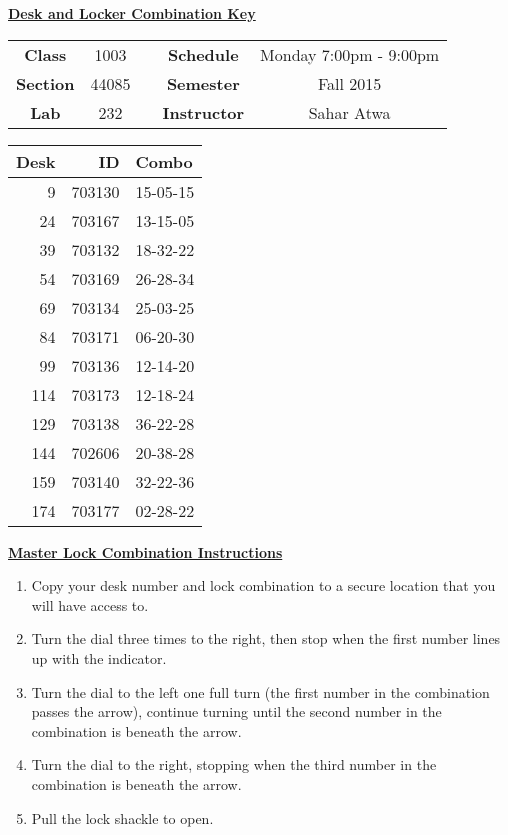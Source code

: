 \documentclass[12pt]{article}
\begin{document}
\thispagestyle{empty}

\begin{center}
	{\huge\textbf{\underline{ Desk and Locker Combination Key}}}
\end{center}


\begin{table}[h]
  \centering
  \begin{tabular}{ccccc}

  \textbf{Class} & 1003 & {\qquad} &\textbf{Schedule} & Monday 7:00pm - 9:00pm \\
  \textbf{Section} & 44085 & {\qquad} & \textbf{Semester} & Fall 2015 \\
  \textbf{Lab} & 232 & {\qquad} & \textbf{Instructor} & Sahar Atwa \\
  \end{tabular}
\end{table}
 \vspace{0.1in}
\begin{minipage}{0.4\textwidth}

\begin{tabular}{rrl}
\toprule
 Desk &      ID &     Combo \\
\midrule
    9 &  703130 &  15-05-15 \\
   24 &  703167 &  13-15-05 \\
   39 &  703132 &  18-32-22 \\
   54 &  703169 &  26-28-34 \\
   69 &  703134 &  25-03-25 \\
   84 &  703171 &  06-20-30 \\
   99 &  703136 &  12-14-20 \\
  114 &  703173 &  12-18-24 \\
  129 &  703138 &  36-22-28 \\
  144 &  702606 &  20-38-28 \\
  159 &  703140 &  32-22-36 \\
  174 &  703177 &  02-28-22 \\
\bottomrule
\end{tabular}


\end{minipage}
\begin{minipage}{0.4\textwidth}
\underline{{\large \textbf{Master Lock Combination Instructions}}}
\begin{enumerate}
\item Copy your desk number and lock combination to a secure location that you will have access to.
\item Turn the dial three times to the right, then stop when the first number lines up with the indicator.
\item Turn the dial to the left one full turn (the first number in the combination passes the arrow), continue turning until the second number in the combination is beneath the arrow.
\item Turn the dial to the right, stopping when the third number in the combination is beneath the arrow.
\item Pull the lock shackle to open.
\end{enumerate}
\end{minipage}
\end{document}

